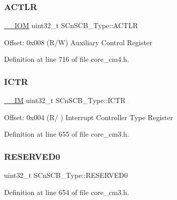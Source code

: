 \subsubsection{\texorpdfstring{A\+C\+T\+LR}{ACTLR}}
{\footnotesize\ttfamily \hyperlink{core__sc300_8h_ab6caba5853a60a17e8e04499b52bf691}{\+\_\+\+\_\+\+I\+OM} uint32\+\_\+t S\+Cn\+S\+C\+B\+\_\+\+Type\+::\+A\+C\+T\+LR}

Offset\+: 0x008 (R/W) Auxiliary Control Register 

Definition at line 716 of file core\+\_\+cm4.\+h.

\mbox{\label{struct_s_cn_s_c_b___type_a34ec1d771245eb9bd0e3ec9336949762}} 
\subsubsection{\texorpdfstring{I\+C\+TR}{ICTR}}
{\footnotesize\ttfamily \hyperlink{core__sc300_8h_a4cc1649793116d7c2d8afce7a4ffce43}{\+\_\+\+\_\+\+IM} uint32\+\_\+t S\+Cn\+S\+C\+B\+\_\+\+Type\+::\+I\+C\+TR}

Offset\+: 0x004 (R/ ) Interrupt Controller Type Register 

Definition at line 655 of file core\+\_\+cm3.\+h.

\mbox{\label{struct_s_cn_s_c_b___type_a758b3cae751b227e20698256b6249dd4}} 
\subsubsection{\texorpdfstring{R\+E\+S\+E\+R\+V\+E\+D0}{RESERVED0}}
{\footnotesize\ttfamily uint32\+\_\+t S\+Cn\+S\+C\+B\+\_\+\+Type\+::\+R\+E\+S\+E\+R\+V\+E\+D0}



Definition at line 654 of file core\+\_\+cm3.\+h.

\mbox{\label{struct_s_cn_s_c_b___type_a0bce3f86e9f6e00085cf5a126ae201c6}} 
